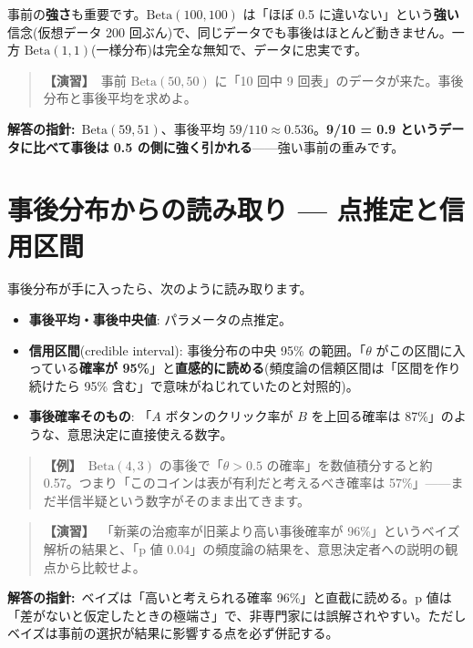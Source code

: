 \documentclass{article}
\begin{document}
事前の\textbf{強さ}も重要です。\(\mathrm{Beta}(100, 100)\) は「ほぼ 0.5 に違いない」という\textbf{強い}信念(仮想データ 200 回ぶん)で、同じデータでも事後はほとんど動きません。一方 \(\mathrm{Beta}(1, 1)\)(一様分布)は完全な無知で、データに忠実です。

\begin{quote}
\textbf{【演習】}\ 事前 \(\mathrm{Beta}(50, 50)\) に「10 回中 9 回表」のデータが来た。事後分布と事後平均を求めよ。
\end{quote}

\textbf{解答の指針:}\ \(\mathrm{Beta}(59, 51)\)、事後平均 \(59/110 \approx 0.536\)。\textbf{9/10 = 0.9 というデータに比べて事後は 0.5 の側に強く引かれる}——強い事前の重みです。

\section{事後分布からの読み取り — 点推定と信用区間}

事後分布が手に入ったら、次のように読み取ります。

\begin{itemize}
\item \textbf{事後平均・事後中央値}: パラメータの点推定。
\item \textbf{信用区間}(credible interval): 事後分布の中央 95\% の範囲。「\(\theta\) がこの区間に入っている\textbf{確率が 95\%}」と\textbf{直感的に読める}(頻度論の信頼区間は「区間を作り続けたら 95\% 含む」で意味がねじれていたのと対照的)。
\item \textbf{事後確率そのもの}: 「\(A\) ボタンのクリック率が \(B\) を上回る確率は 87\%」のような、意思決定に直接使える数字。
\end{itemize}

\begin{quote}
\textbf{【例】}\ \(\mathrm{Beta}(4, 3)\) の事後で「\(\theta > 0.5\) の確率」を数値積分すると約 0.57。つまり「このコインは表が有利だと考えるべき確率は 57\%」——まだ半信半疑という数字がそのまま出てきます。
\end{quote}

\begin{quote}
\textbf{【演習】}\ 「新薬の治癒率が旧薬より高い事後確率が 96\%」というベイズ解析の結果と、「p 値 0.04」の頻度論の結果を、意思決定者への説明の観点から比較せよ。
\end{quote}

\textbf{解答の指針:}\ ベイズは「高いと考えられる確率 96\%」と直截に読める。p 値は「差がないと仮定したときの極端さ」で、非専門家には誤解されやすい。ただしベイズは事前の選択が結果に影響する点を必ず併記する。
\end{document}
